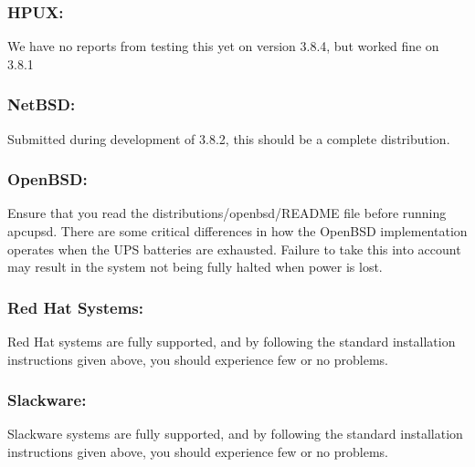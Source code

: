 \label{HPUX}

\subsubsection*{HPUX:}

\label{index-HPUX-38}
\label{index-OS_002c-HPUX-39}
We have no reports from testing this yet on version 3.8.4, but worked fine on
3.8.1 

\label{NetBSD}

\subsubsection*{NetBSD:}

\label{index-NetBSD-40}
\label{index-OS_002c-NetBSD-41}
Submitted during development of 3.8.2, this should be a complete distribution.

\label{OpenBSD}

\subsubsection*{OpenBSD:}

\label{index-OpenBSD-42}
\label{index-OS_002c-OpenBSD-43}
Ensure that you read the distributions/openbsd/README file before running
apcupsd. There are some critical differences in how the OpenBSD implementation
operates when the UPS batteries are exhausted. Failure to take this into
account may result in the system not being fully halted when power is lost. 

\label{Red-Hat-Systems}

\subsubsection*{Red Hat Systems:}

\label{index-Red-Hat-44}
\label{index-OS_002c-Red-Hat-45}
Red Hat systems are fully supported, and by following the standard
installation instructions given above, you should experience few or no
problems. 

\label{Slackware}

\subsubsection*{Slackware:}

\label{index-Slackware-46}
\label{index-OS_002c-Slackware-47}
Slackware systems are fully supported, and by following the standard
installation instructions given above, you should experience few or no
problems. 

